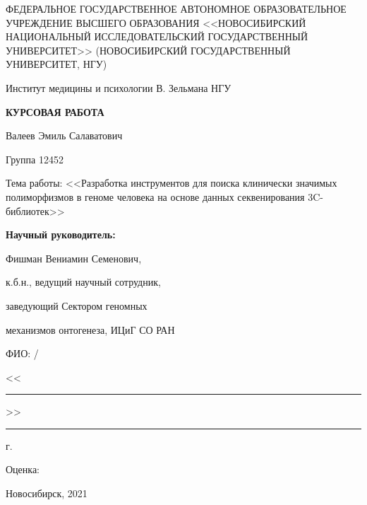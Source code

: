 \documentclass[a4paper,14pt]{extarticle}
\begin{document}
\begin{titlepage}

\begin{center}
 \begin{small}
ФЕДЕРАЛЬНОЕ ГОСУДАРСТВЕННОЕ АВТОНОМНОЕ ОБРАЗОВАТЕЛЬНОЕ УЧРЕЖДЕНИЕ ВЫСШЕГО ОБРАЗОВАНИЯ <<НОВОСИБИРСКИЙ НАЦИОНАЛЬНЫЙ ИССЛЕДОВАТЕЛЬСКИЙ ГОСУДАРСТВЕННЫЙ УНИВЕРСИТЕТ>> (НОВОСИБИРСКИЙ ГОСУДАРСТВЕННЫЙ УНИВЕРСИТЕТ, НГУ)

Институт медицины и психологии В. Зельмана НГУ
\end{small}

\vspace{4cm}

\begin{LARGE}{\textbf{КУРСОВАЯ РАБОТА}}\end{LARGE}

\vspace{0.5cm}

Валеев Эмиль Салаватович

Группа 12452


Тема работы: <<Разработка инструментов для поиска клинически значимых полиморфизмов в геноме человека на основе данных секвенирования 3C\hyp{}библиотек>>

\end{center}

\vfill

\hfill
\begin{minipage}{0.57\textwidth}

\textbf{Научный руководитель:}

Фишман Вениамин Семенович,

к.б.н., ведущий научный сотрудник,

заведующий Сектором геномных

механизмов онтогенеза, ИЦиГ СО РАН

\vspace{1cm}

ФИО: \hrulefill/\hrulefill

<<\rule{2em}{0.4pt}>>\rule{2em}{0.4pt} г.


Оценка: \hrulefill

\end{minipage}

\vfill

{\centering \begin{small}Новосибирск, 2021\end{small}\par}

\end{titlepage}
\end{document}
